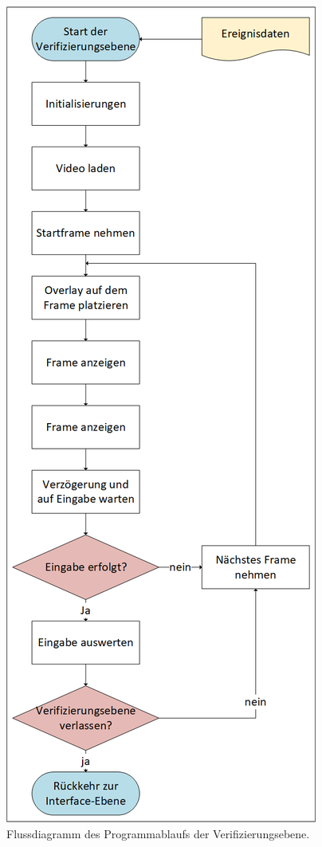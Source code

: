 \begin{figure}[p]
    \centering
    \includegraphics[height=0.9\textheight]{img/Grafiken/Flussdiagramm Verifikationsebene.png}
    \caption{Flussdiagramm des Programmablaufs der Verifizierungsebene.}
    \label{fig:FlussDia VerifyEbene}
\end{figure}

